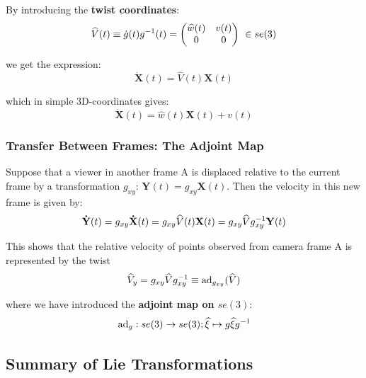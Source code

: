 By introducing the \textbf{twist coordinates}:
	\[\widehat{V}(t) \equiv \dot{g}(t)g^{-1}(t) = \begin{pmatrix}
		\widehat{w}(t) & v(t) \\
		0 & 0 \\
	\end{pmatrix}\ \in se(3)\]

we get the expression:
	\[\boxed{\bm{\dot{X}}(t) = \widehat{V}(t)\bm{X}(t)}\]

which in simple 3D-coordinates gives:
	\[\bm{\dot{X}}(t) = \widehat{w}(t)\bm{X}(t) + v(t)\]


\subsubsection{Transfer Between Frames: The Adjoint Map}%
\label{ssub:transfer_between_frames_the_adjoint_map}

Suppose that a viewer in another frame A is displaced relative to the current frame
by a transformation $g_{xy}$: $\mathbf{Y}(t) = g_{xy} \mathbf{X}(t)$.
Then the velocity in this new frame is given by:
\[\mathbf{\dot{Y}}(t)
	= g_{xy} \mathbf{\dot{X}}(t)
	= g_{xy} \widehat{V}(t) \mathbf{X}(t)
	= g_{xy} \widehat{V} g_{xy}^{-1} \mathbf{Y}(t)\]

This shows that the relative velocity of points observed from camera frame A
is represented by the twist
\[\widehat{V}_y = g_{xy} \widehat{V} g_{xy}^{-1}
	\equiv \text{ad}_{g_{xy}}(\widehat{V})\]

where we have introduced the \textbf{adjoint map on $se(3)$}:
\[\text{ad}_g : se(3) \rightarrow se(3);
	\widehat{\xi} \mapsto g \widehat{\xi} g^{-1}\]


\subsection{Summary of Lie Transformations}%
\label{sub:summary_of_lie_transformations}


